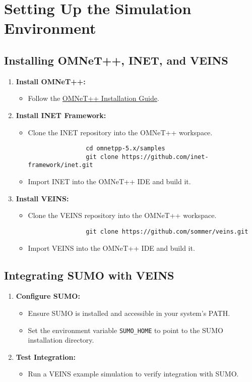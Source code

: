 \documentclass{article}
\begin{document}
	\section{Setting Up the Simulation Environment}
	\subsection{Installing OMNeT++, INET, and VEINS}
	
	\begin{enumerate}
		\item \textbf{Install OMNeT++:}
		\begin{itemize}
			\item Follow the \href{https://doc.omnetpp.org/omnetpp/InstallGuide.pdf}{OMNeT++ Installation Guide}.
		\end{itemize}
		\item \textbf{Install INET Framework:}
		\begin{itemize}
			\item Clone the INET repository into the OMNeT++ workspace.
			\begin{verbatim}
				cd omnetpp-5.x/samples
				git clone https://github.com/inet-framework/inet.git
			\end{verbatim}
			\item Import INET into the OMNeT++ IDE and build it.
		\end{itemize}
		\item \textbf{Install VEINS:}
		\begin{itemize}
			\item Clone the VEINS repository into the OMNeT++ workspace.
			\begin{verbatim}
				git clone https://github.com/sommer/veins.git
			\end{verbatim}
			\item Import VEINS into the OMNeT++ IDE and build it.
		\end{itemize}
	\end{enumerate}
	
	\subsection{Integrating SUMO with VEINS}
	
	\begin{enumerate}
		\item \textbf{Configure SUMO:}
		\begin{itemize}
			\item Ensure SUMO is installed and accessible in your system's PATH.
			\item Set the environment variable \texttt{SUMO\_HOME} to point to the SUMO installation directory.
		\end{itemize}
		\item \textbf{Test Integration:}
		\begin{itemize}
			\item Run a VEINS example simulation to verify integration with SUMO.
		\end{itemize}
	\end{enumerate}
	
\end{document}
